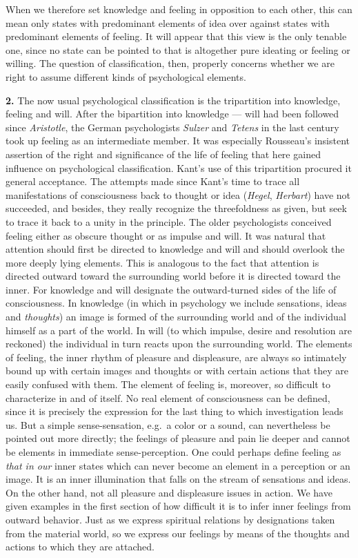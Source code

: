 \documentclass[12pt,a4paper]{book}
\newcommand{\opage}[1]{\marginnote{\footnotesize\textit{[#1]}}}
\begin{document}
When we therefore set knowledge and feeling in opposition to each other,
this can mean only states with predominant elements of idea over against
states with predominant elements of feeling. It will appear that this
view is the only tenable one, since no state can be pointed to that is
altogether pure
\opage{105}ideating or feeling or willing. The question of classification,
then, properly concerns whether we are right to assume different kinds of
psychological elements.

\textbf{2.} The now usual psychological classification is the tripartition
into knowledge, feeling and will. After the bipartition into knowledge
--- will had been followed since \emph{Aristotle}, the German
psychologists \emph{Sulzer} and \emph{Tetens} in the last century took up
feeling as an intermediate member. It was especially Rousseau's insistent
assertion of the right and significance of the life of feeling that here
gained influence on psychological classification. Kant's use of this
tripartition procured it general acceptance. The attempts made since
Kant's time to trace all manifestations of consciousness back to thought
or idea (\emph{Hegel}, \emph{Herbart}) have not succeeded, and besides,
they really recognize the threefoldness as given, but seek to trace it
back to a unity in the principle. The older psychologists conceived
feeling either as obscure thought or as impulse and will. It was natural
that attention should first be directed to knowledge and will and should
overlook the more deeply lying elements. This is analogous to the fact
that attention is directed outward toward the surrounding world before it
is directed toward the inner. For knowledge and will designate the
outward-turned sides of the life of consciousness. In knowledge (in which
in psychology we include sensations, ideas and \emph{thoughts}) an image
is formed of the surrounding world and of the individual himself as a
part of the world. In will (to which impulse, desire and resolution are
reckoned) the individual in turn reacts upon the surrounding world. The
elements of feeling, the inner rhythm of pleasure and displeasure, are
always so intimately bound up with certain images and thoughts or with
certain actions that they are easily confused with them. The element of
feeling is, moreover, so difficult to characterize in and of itself. No
real element of consciousness can be defined, since it is precisely the
expression for the last thing to which investigation leads us. But a
simple sense-sensation, e.g.\ a color or a sound, can nevertheless be
pointed out more directly; the feelings of pleasure and pain lie deeper
and cannot be elements in immediate sense-perception. One could perhaps
define feeling as \emph{that in our} inner states which can never become
an element in a perception or an image. It is an inner illumination that
falls on the stream of sensations and ideas. On the
\opage{106}other hand, not all pleasure and displeasure issues in action.
We have given examples in the first section of how difficult it is to
infer inner feelings from outward behavior. Just as we express spiritual
relations by designations taken from the material world, so we express
our feelings by means of the thoughts and actions to which they are
attached.
\end{document}
